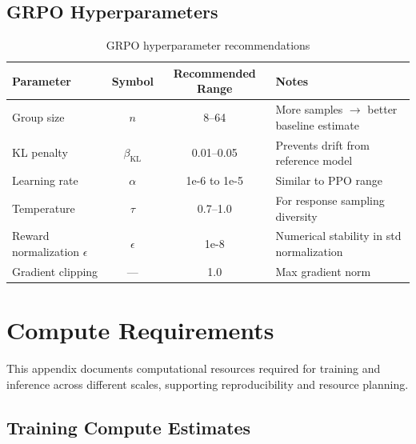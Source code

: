 \documentclass[12pt,a4paper]{report}
\theoremstyle{definition}
\begin{document}
\section{GRPO Hyperparameters}

\begin{table}[htbp]
\centering
\caption{GRPO hyperparameter recommendations}
\label{tab:grpo_hyperparams}
\begin{tabular}{@{}lccl@{}}
\toprule
\textbf{Parameter} & \textbf{Symbol} & \textbf{Recommended Range} & \textbf{Notes} \\
\midrule
Group size & $n$ & 8--64 & More samples $\rightarrow$ better baseline estimate \\
KL penalty & $\beta_{\text{KL}}$ & 0.01--0.05 & Prevents drift from reference model \\
Learning rate & $\alpha$ & 1e-6 to 1e-5 & Similar to PPO range \\
Temperature & $\tau$ & 0.7--1.0 & For response sampling diversity \\
Reward normalization $\epsilon$ & $\epsilon$ & 1e-8 & Numerical stability in std normalization \\
Gradient clipping & --- & 1.0 & Max gradient norm \\
\bottomrule
\end{tabular}
\end{table}



\chapter{Compute Requirements}
\label{app:compute}

This appendix documents computational resources required for training and inference across different scales, supporting reproducibility and resource planning.

\section*{Training Compute Estimates}
\end{document}
